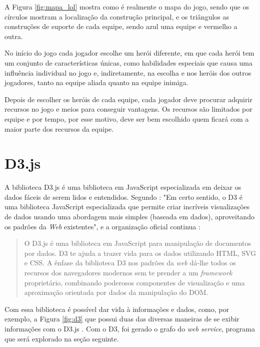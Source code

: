 A Figura \ref{fig:mapa_lol} mostra como é realmente o mapa do jogo, sendo que os círculos mostram a localização da construção principal, e os triângulos as construções de suporte de cada equipe, sendo azul uma equipe e vermelho a outra.
    
No início do jogo cada jogador escolhe  um  herói  diferente, em que  cada  herói tem um conjunto de características únicas, como habilidades especiais que causa uma influência individual no jogo e, indiretamente, na escolha e nos heróis dos outros jogadores, tanto na equipe aliada quanto na equipe inimiga.
    
Depois de escolher os heróis de cada equipe, cada jogador deve procurar adquirir recursos no jogo e meios para conseguir vantagens. Os recursos são limitados por equipe e por tempo, por esse motivo, deve ser bem escolhido quem ficará com a maior parte dos recursos da equipe.
\section{D3.js}
A biblioteca D3.js é uma biblioteca em JavaScript especializada em deixar os dados fáceis de serem lidos e entendidos. Segundo \citet{d3cook}: "Em certo sentido, o D3 é uma biblioteca JavaScript especializada que permite criar incríveis visualizações de dados usando uma abordagem mais simples (baseada em dados), aproveitando os padrões da \textit{Web} existentes", e a organização oficial continua :


\begin{quote}
	O D3.js é uma biblioteca em JavaScript para manipulação de documentos por dados. D3 te ajuda a trazer vida para os dados utilizando HTML, SVG e CSS. A ênfase da biblioteca D3 nos padrões da \textit{web} dá-lhe todos os recursos dos navegadores modernos sem te prender a um \textit{framework} proprietário, combinando poderosos componentes de visualização e uma aproximação orientada por dados da manipulação do DOM.
	\cite[tradução do autor]{d3js}
\end{quote}


Com essa biblioteca é possível dar vida à informações e dados, como, por exemplo, a Figura \ref{fig:d3} que possui duas das diversas maneiras de se exibir informações com o D3.js . Com o D3, foi gerado o grafo do \textit{web service}, programa que será explorado na seção seguinte.

